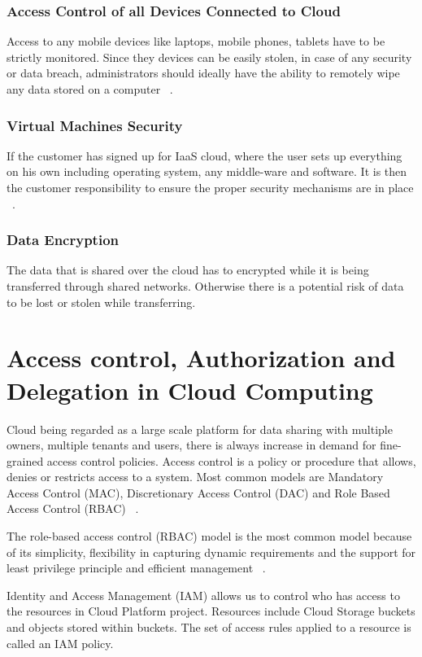 \documentclass[sigconf]{acmart}
\begin{document}
\subsubsection{Access Control of all Devices Connected to Cloud}
Access to any mobile devices like laptops, mobile phones, tablets have to be 
strictly monitored. Since they devices can be easily stolen, in case of any 
security or data breach, administrators should ideally have the ability 
to remotely wipe any data stored on a computer ~\cite{hid-sp18-513-diversity}.

\subsubsection{Virtual Machines Security}
If the customer has signed up for IaaS cloud, where the user sets up
everything on his own including operating system, any middle-ware
and software. It is then the customer responsibility to ensure the
proper security mechanisms are in place ~\cite{hid-sp18-513-diversity}.
\subsubsection{Data Encryption}
The data that is shared over the cloud has to encrypted while it 
is being transferred through shared networks. Otherwise there is a 
potential risk of data to be lost or stolen while transferring.

\section{Access control, Authorization and Delegation in Cloud Computing}
Cloud being regarded as a large scale platform for data sharing with 
multiple owners, multiple tenants and users, there is always increase in
demand for fine-grained access control policies. Access control is a policy 
or procedure that allows, denies or restricts access to a system. Most
common models are Mandatory Access Control (MAC), Discretionary Access 
Control (DAC) and Role Based Access Control (RBAC) ~\cite{hid-sp18-513-accesscntrl}.

The role-based access control (RBAC) model is the most common 
model because of its simplicity, flexibility in capturing dynamic 
requirements and the support for least privilege principle 
and efficient management ~\cite{hid-sp18-513-cloud3}. 

Identity and Access Management (IAM) allows us to control who has access 
to the resources in Cloud Platform project. Resources include Cloud Storage 
buckets and objects stored within buckets. The set of access rules 
applied to a resource is called an IAM policy. 
\end{document}
